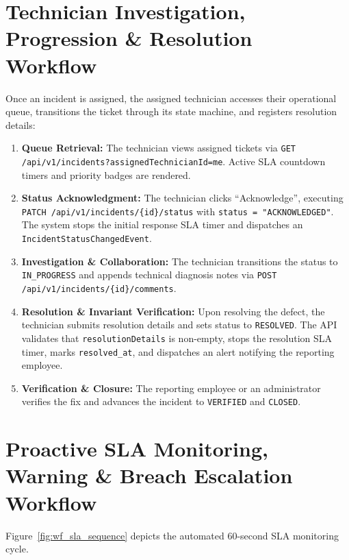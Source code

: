 \documentclass[11pt,a4paper,oneside]{report}
\begin{document}
\section{Technician Investigation, Progression \& Resolution Workflow}
\label{sec:wf_technician_progression}
Once an incident is assigned, the assigned technician accesses their operational queue, transitions the ticket through its state machine, and registers resolution details:
\begin{enumerate}
    \item \textbf{Queue Retrieval:} The technician views assigned tickets via \texttt{GET /api/v1/incidents?assignedTechnicianId=me}. Active SLA countdown timers and priority badges are rendered.
    \item \textbf{Status Acknowledgment:} The technician clicks ``Acknowledge'', executing \texttt{PATCH /api/v1/incidents/\{id\}/status} with \texttt{status = "ACKNOWLEDGED"}. The system stops the initial response SLA timer and dispatches an \texttt{IncidentStatusChangedEvent}.
    \item \textbf{Investigation \& Collaboration:} The technician transitions the status to \texttt{IN\_PROGRESS} and appends technical diagnosis notes via \texttt{POST /api/v1/incidents/\{id\}/comments}.
    \item \textbf{Resolution \& Invariant Verification:} Upon resolving the defect, the technician submits resolution details and sets status to \texttt{RESOLVED}. The API validates that \texttt{resolutionDetails} is non-empty, stops the resolution SLA timer, marks \texttt{resolved\_at}, and dispatches an alert notifying the reporting employee.
    \item \textbf{Verification \& Closure:} The reporting employee or an administrator verifies the fix and advances the incident to \texttt{VERIFIED} and \texttt{CLOSED}.
\end{enumerate}

\section{Proactive SLA Monitoring, Warning \& Breach Escalation Workflow}
\label{sec:wf_sla_escalation}
Figure~\ref{fig:wf_sla_sequence} depicts the automated 60-second SLA monitoring cycle.
\end{document}
